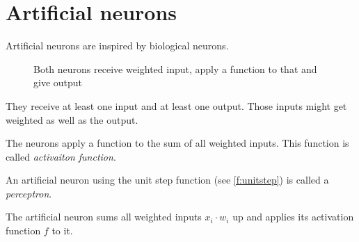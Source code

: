 \section{Artificial neurons}
\label{ch:Content2:sec:Section1}

Artificial neurons are inspired by biological neurons.

\begin{figure}[ht]
    \centering
    \label{Neilsche-Parabel}
    \caption{Both neurons receive weighted input, apply a function to that and give output}
\end{figure}

They receive at least one
input and at least one output. Those inputs might get weighted as well as the
output.

The neurons apply a function to the sum of all weighted inputs. This function
is called \textit{activaiton function}.

An artificial neuron using the unit step function (see \cref{f:unitstep}) is called
a \textit{perceptron}.


The artificial neuron sums all weighted inputs $x_i \cdot w_i$ up
             and applies its activation function $f$ to it.